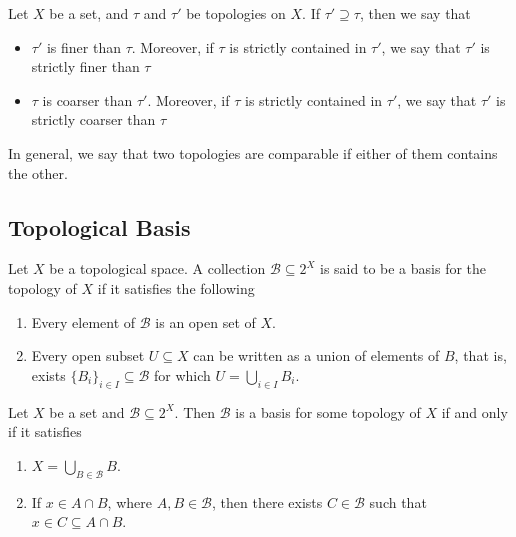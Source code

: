 \begin{definition}
    \label{def:coarser-finer-topology}
    Let \(X\) be a set, and \(\tau\) and \(\tau'\) be topologies on
    \(X\). If \(\tau' \supseteq \tau\), then we say that
    \begin{itemize}\setlength\itemsep{0em}
        \item \(\tau'\) is finer than \(\tau\). Moreover, if \(\tau\)
              is strictly contained in \(\tau'\), we say that \(\tau'\) is
              strictly finer than \(\tau\)

        \item \(\tau\) is coarser than \(\tau'\). Moreover, if \(\tau\)
              is strictly contained in \(\tau'\), we say that \(\tau'\) is
              strictly coarser than \(\tau\)
    \end{itemize}
    In general, we say that two topologies are comparable if either of them contains
    the other.
\end{definition}

\subsection{Topological Basis}

\begin{definition}[Basis]\label{def: base}
    Let \(X\) be a topological space. A collection \(\mathcal B \subseteq 2^X\) is
    said to be a basis for the topology of \(X\) if it satisfies the following
    \begin{enumerate}[(B1)]\setlength\itemsep{0em}
        \item Every element of \(\mathcal B\) is an open set of \(X\).
        \item Every open subset \(U \subseteq X\) can be written as a union of
              elements of \(B\), that is, exists \(\{B_i\}_{i \in I} \subseteq \mathcal
              B\) for which \(U = \bigcup_{i \in  I} B_i\).
    \end{enumerate}
\end{definition}

\begin{proposition}
    \label{prop:equivalent-basis}
    Let \(X\) be a set and \(\mathcal B \subseteq 2^X\). Then \(\mathcal B\) is a
    basis for some topology of \(X\) if and only if it satisfies
    \begin{enumerate}[B1]\setlength\itemsep{0em}
        \item\label{item:basis-union-property}
        \(X = \bigcup_{B \in \mathcal B} B\).

        \item\label{item:basis-intersection-property}
        If \(x \in A \cap B\), where \(A, B \in \mathcal B\), then there exists
        \(C \in \mathcal B\) such that \(x \in C \subseteq A \cap B\).
    \end{enumerate}
\end{proposition}

